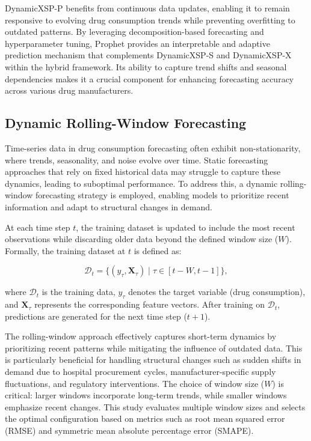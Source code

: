 \documentclass[journal]{IEEEtran}
\begin{document}
DynamicXSP-P benefits from continuous data updates, enabling it to remain responsive to evolving drug consumption trends while preventing overfitting to outdated patterns. By leveraging decomposition-based forecasting and hyperparameter tuning, Prophet provides an interpretable and adaptive prediction mechanism that complements DynamicXSP-S and DynamicXSP-X within the hybrid framework. Its ability to capture trend shifts and seasonal dependencies makes it a crucial component for enhancing forecasting accuracy across various drug manufacturers.

\subsection{Dynamic Rolling-Window Forecasting}

Time-series data in drug consumption forecasting often exhibit non-stationarity, where trends, seasonality, and noise evolve over time. Static forecasting approaches that rely on fixed historical data may struggle to capture these dynamics, leading to suboptimal performance. To address this, a dynamic rolling-window forecasting strategy is employed, enabling models to prioritize recent information and adapt to structural changes in demand.

At each time step \(t\), the training dataset is updated to include the most recent observations while discarding older data beyond the defined window size (\(W\)). Formally, the training dataset at \(t\) is defined as:

\[
\mathcal{D}_{t} = \{(y_{\tau}, \mathbf{X}_{\tau}) \mid \tau \in [t - W, t-1]\},
\]

where \(\mathcal{D}_{t}\) is the training data, \(y_{\tau}\) denotes the target variable (drug consumption), and \(\mathbf{X}_{\tau}\) represents the corresponding feature vectors. After training on \(\mathcal{D}_{t}\), predictions are generated for the next time step (\(t+1\)).

The rolling-window approach effectively captures short-term dynamics by prioritizing recent patterns while mitigating the influence of outdated data. This is particularly beneficial for handling structural changes such as sudden shifts in demand due to hospital procurement cycles, manufacturer-specific supply fluctuations, and regulatory interventions. The choice of window size (\(W\)) is critical: larger windows incorporate long-term trends, while smaller windows emphasize recent changes. This study evaluates multiple window sizes and selects the optimal configuration based on metrics such as root mean squared error (RMSE) and symmetric mean absolute percentage error (SMAPE).
\end{document}
